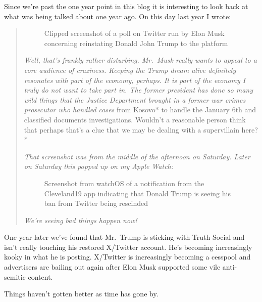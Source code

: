 Since we're past the one year point in this blog it is interesting to
look back at what was being talked about one year ago. On this day last
year I wrote:

\begin{quote}
\begin{figure}
\centering
{}
\caption{Clipped screenshot of a poll on Twitter run by Elon Musk
concerning reinstating Donald John Trump to the platform}
\end{figure}

\emph{Well, that's frankly rather disturbing. Mr.~Musk really wants to
appeal to a core audience of craziness. Keeping the Trump dream alive
definitely resonates with part of the economy, perhaps. It is part of
the economy I truly do not want to take part in. The former president
has done so many wild things that the Justice Department brought in a
former war crimes prosecutor who handled cases }from Kosovo* to handle
the January 6th and classified documents investigations. Wouldn't a
reasonable person think that perhaps that's a clue that we may be
dealing with a supervillain here?*

\emph{That screenshot was from the middle of the afternoon on Saturday.
Later on Saturday this popped up on my Apple Watch:}

\begin{figure}
\centering
{}
\caption{Screenshot from watchOS of a notification from the Cleveland19
app indicating that Donald Trump is seeing his ban from Twitter being
rescinded}
\end{figure}

\emph{We're seeing bad things happen now!}
\end{quote}

One year later we've found that Mr.~Trump is sticking with Truth Social
and isn't really touching his restored X/Twitter account. He's becoming
increasingly kooky in what he is posting. X/Twitter is increasingly
becoming a cesspool and advertisers are bailing out again after Elon
Musk supported some vile anti-semitic content.

Things haven't gotten better as time has gone by.

